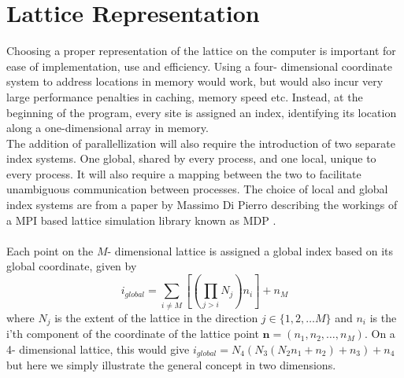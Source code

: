 \documentclass[a4paper,10pt]{book}
\begin{document}
\section{Lattice Representation}
Choosing a proper representation of the lattice on the computer is important for ease of implementation, use and efficiency. Using a four- dimensional coordinate system to address locations in memory would work, but would also incur very large performance penalties in caching, memory speed etc. Instead, at the beginning of the program, every site is assigned an index, identifying its location along a one-dimensional array in memory.\\The addition of parallellization will also require the introduction of two separate index systems. One global, shared by every process, and one local, unique to every process. It will also require a mapping between the two to facilitate unambiguous communication between processes. The choice of local and global index systems are from a paper by Massimo Di Pierro describing the workings of a MPI based lattice simulation library known as MDP \cite{MDP}.\\\\Each point on the $M$- dimensional lattice is assigned a global index based on its global coordinate, given by 
\begin{equation}
i_{global} = \sum\limits_{i\neq M}\left[ \left( \prod\limits_{j> i}N_j \right)n_i \right] + n_M
\end{equation}
where $N_j$ is the extent of the lattice in the direction $j \in \{1,2,\ldots M \}$ and $n_i$ is the i'th component of the coordinate of the lattice point $\textbf{n} = (n_1,n_2,\ldots,n_M)$. On a 4- dimensional lattice, this would give $i_{global} = N_4(N_3(N_2n_1+n_2)+n_3)+n_4$ but here we simply illustrate the general concept in two dimensions.
\end{document}
